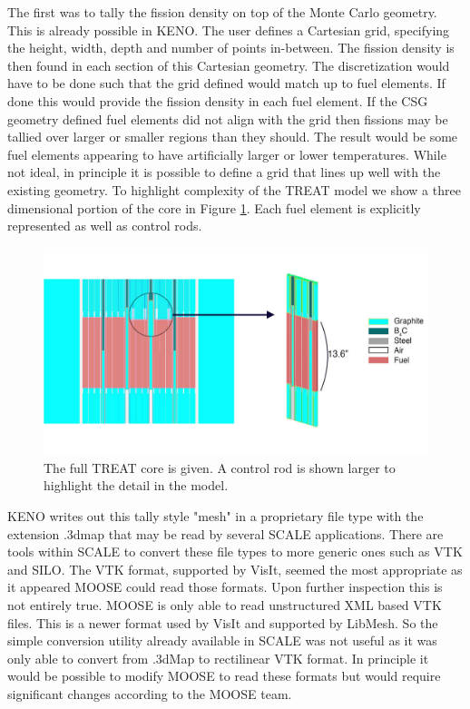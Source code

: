 \documentclass[11pt]{article}
\begin{document}
The first was to tally the fission density on top of the Monte Carlo geometry.  This is already possible in KENO.  The user defines a Cartesian grid, specifying the height, width, depth and number of points in-between.   The fission density is then found in each section of this Cartesian geometry.  The discretization would have to be done such that the grid defined would match up to fuel elements.  If done this would provide the fission density in each fuel element.  If the CSG geometry defined fuel elements did not align with the grid then fissions may be tallied over larger or smaller regions than they should.  The result would be some fuel elements appearing to have artificially larger or lower temperatures.  While not ideal, in principle it is possible to define a grid that lines up well with the existing geometry.  To highlight complexity of the TREAT model we show a three dimensional portion of the core in Figure \ref{fig:treat3d}. Each fuel element is explicitly represented as well as control rods. 

\begin{figure}[h]
    \centering
    \includegraphics[width=14cm]{figures/big_to_small}
    \caption{The full TREAT core is given.  A control rod is shown larger to highlight the detail in the model.}
    \label{fig:treat3d}
\end{figure}

KENO writes out this tally style "mesh" in a proprietary file type with the extension .3dmap that may be read by several SCALE applications.  There are tools within SCALE to convert these file types to more generic ones such as VTK and SILO.  The VTK format, supported by VisIt, seemed the most appropriate as it appeared MOOSE could read those formats.  Upon further inspection this is not entirely true. MOOSE is only able to read unstructured XML based VTK files.  This is a newer format used by VisIt and supported by LibMesh.  So the simple conversion utility already available in SCALE was not useful as it was only able to convert from .3dMap to rectilinear VTK format.  In principle it would be possible to modify MOOSE to read these formats but would require significant changes according to the MOOSE team.  
\end{document}

